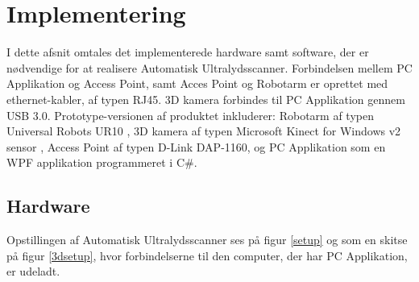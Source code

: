 \section{Implementering}
I dette afsnit omtales det implementerede hardware samt software, der er nødvendige for at realisere Automatisk Ultralydsscanner. Forbindelsen mellem PC Applikation og Access Point, samt Acces Point og Robotarm er oprettet med ethernet-kabler, af typen RJ45. 3D kamera forbindes til PC Applikation gennem USB 3.0. 
Prototype-versionen af produktet inkluderer:
Robotarm af typen Universal Robots UR10 \cite{ur10kilde}, 3D kamera af typen Microsoft Kinect for Windows v2 sensor \cite{kinectkilde}, Access Point af typen D-Link DAP-1160, og PC Applikation som en WPF applikation programmeret i C\#.
\subsection{Hardware}
Opstillingen af Automatisk Ultralydsscanner ses på figur \ref{setup} og som en skitse på figur \ref{3dsetup}, hvor forbindelserne til den computer, der har PC Applikation, er udeladt. 


